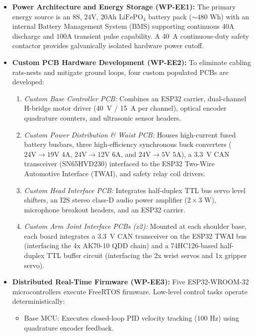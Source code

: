 \begin{itemize}[leftmargin=1.5em]
  \item \textbf{Power Architecture and Energy Storage (WP-EE1):} The primary energy source is an $8\text{S}$, $24\text{V}$, $20\text{Ah}$ $\text{LiFePO}_4$ battery pack ($\sim 480\text{ Wh}$) with an internal Battery Management System (BMS) supporting continuous $40\text{A}$ discharge and $100\text{A}$ transient pulse capability. A 40~A continuous-duty safety contactor provides galvanically isolated hardware power cutoff.
  \item \textbf{Custom PCB Hardware Development (WP-EE2):} To eliminate cabling rats-nests and mitigate ground loops, four custom populated PCBs are developed:
  \begin{enumerate}[leftmargin=1.2em]
    \item \emph{Custom Base Controller PCB:} Combines an ESP32 carrier, dual-channel H-bridge motor driver (40~V / 15~A per channel), optical encoder quadrature counters, and ultrasonic sensor headers.
    \item \emph{Custom Power Distribution \& Waist PCB:} Houses high-current fused battery busbars, three high-efficiency synchronous buck converters ($24\text{V} \rightarrow 19\text{V } 4\text{A}$, $24\text{V} \rightarrow 12\text{V } 6\text{A}$, and $24\text{V} \rightarrow 5\text{V } 5\text{A}$), a 3.3~V CAN transceiver (SN65HVD230) interfaced to the ESP32 Two-Wire Automotive Interface (TWAI), and safety relay coil drivers.
    \item \emph{Custom Head Interface PCB:} Integrates half-duplex TTL bus servo level shifters, an I2S stereo class-D audio power amplifier ($2 \times 3\text{ W}$), microphone breakout headers, and an ESP32 carrier.
    \item \emph{Custom Arm Joint Interface PCBs (x2):} Mounted at each shoulder base, each board integrates a 3.3~V CAN transceiver on the ESP32 TWAI bus (interfacing the 4x AK70-10 QDD chain) and a 74HC126-based half-duplex TTL buffer circuit (interfacing the 2x wrist servos and 1x gripper servo).
  \end{enumerate}
  \item \textbf{Distributed Real-Time Firmware (WP-EE3):} Five ESP32-WROOM-32 microcontrollers execute FreeRTOS firmware. Low-level control tasks operate deterministically:
  \begin{itemize}
    \item Base MCU: Executes closed-loop PID velocity tracking ($100\text{ Hz}$) using quadrature encoder feedback.

\end{itemize}
\end{itemize}
